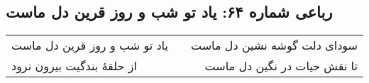 \begin{center}
\section*{رباعی شماره ۶۴: یاد تو شب و روز قرین دل ماست}
\label{sec:sh064}
\begin{longtable}{l p{0.5cm} r}
یاد تو شب و روز قرین دل ماست
&&
سودای دلت گوشه نشین دل ماست
\\
از حلقهٔ بندگیت بیرون نرود
&&
تا نقش حیات در نگین دل ماست
\\
\end{longtable}
\end{center}
